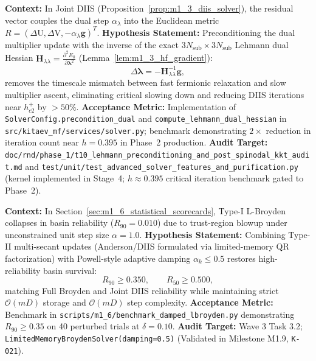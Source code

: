 \begin{contract}
\label{con:h8_dual_hessian_diis}
\textbf{Context:} In Joint DIIS (Proposition~\ref{prop:m1_3_diis_solver}), the residual vector couples the dual step $\alpha_\lambda$ into the Euclidean metric $R = (\Delta \mathrm{U}, \Delta \mathrm{V}, -\alpha_\lambda \mathbf{g})^T$.
\textbf{Hypothesis Statement:} Preconditioning the dual multiplier update with the inverse of the exact $3N_{\mathrm{sub}} \times 3N_{\mathrm{sub}}$ Lehmann dual Hessian $\mathbf{H}_{\lambda\lambda} = \frac{\partial^2 E_0}{\partial \boldsymbol{\lambda}^2}$ (Lemma~\ref{lem:m1_3_hf_gradient}):
\begin{equation}
\Delta \boldsymbol{\lambda} = -\mathbf{H}_{\lambda\lambda}^{-1} \mathbf{g},
\end{equation}
removes the timescale mismatch between fast fermionic relaxation and slow multiplier ascent, eliminating critical slowing down and reducing DIIS iterations near $h_{c2}^+$ by $> 50\%$.
\textbf{Acceptance Metric:} Implementation of \texttt{SolverConfig.precondition\_dual} and \texttt{compute\_lehmann\_dual\_hessian} in \texttt{src/kitaev\_mf/services/solver.py}; benchmark demonstrating $2\times$ reduction in iteration count near $h = 0.395$ in Phase~2 production.
\textbf{Audit Target:} \texttt{doc/rnd/phase\_1/t10\_lehmann\_preconditioning\_and\_post\_spinodal\_kkt\_audit.md} and \texttt{test/unit/test\_advanced\_solver\_features\_and\_purification.py} (kernel implemented in Stage~4; $h \approx 0.395$ critical iteration benchmark gated to Phase~2).
\end{contract}

\begin{contract}
\label{con:h9_lbroyden_stabilization}
\textbf{Context:} In Section~\ref{sec:m1_6_statistical_scorecards}, Type-I L-Broyden collapses in basin reliability ($R_{90} = 0.010$) due to trust-region blowup under unconstrained unit step size $\alpha = 1.0$.
\textbf{Hypothesis Statement:} Combining Type-II multi-secant updates (Anderson/DIIS formulated via limited-memory QR factorization) with Powell-style adaptive damping $\alpha_k \le 0.5$ restores high-reliability basin survival:
\begin{equation}
R_{90} \ge 0.350, \qquad R_{50} \ge 0.500,
\end{equation}
matching Full Broyden and Joint DIIS reliability while maintaining strict $\mathcal{O}(mD)$ storage and $\mathcal{O}(mD)$ step complexity.
\textbf{Acceptance Metric:} Benchmark in \texttt{scripts/m1\_6/benchmark\_damped\_lbroyden.py} demonstrating $R_{90} \ge 0.35$ on 40 perturbed trials at $\delta = 0.10$.
\textbf{Audit Target:} Wave 3 Task 3.2; \texttt{LimitedMemoryBroydenSolver(damping=0.5)} (Validated in Milestone M1.9, \texttt{K-021}).
\end{contract}

